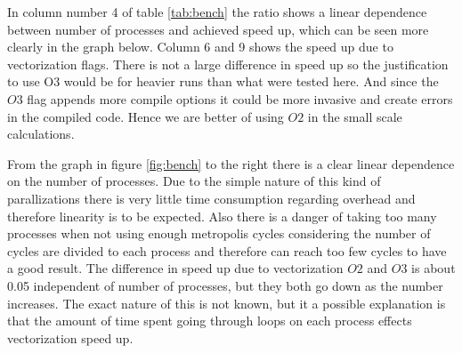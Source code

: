 %

In column number 4 of table \ref{tab:bench} the ratio shows a linear dependence between 
number of processes and achieved speed up, which can be seen more clearly 
in the graph below. Column 6 and 9 shows the speed up due to vectorization flags.
There is not a large difference in speed up so the justification to use O3 would 
be for heavier runs than what were tested here. And since the $O3$ flag appends
more compile options it could be more invasive and create errors in the compiled
code. Hence we are better of using $O2$ in the small scale calculations.

From the graph in figure \ref{fig:bench} to the right there is a clear linear 
dependence on the number of processes. Due to the simple nature of this kind of parallizations there is very
little time consumption regarding overhead and therefore linearity is to be expected.
Also there is a danger of taking too many processes when not using enough metropolis
cycles considering the number of cycles are divided to each process and therefore 
can reach too few cycles to have a good result.
The difference in speed up due to vectorization $O2$ and $O3$ is about 0.05 independent 
of number of processes, but they both go down as the number increases. The exact nature
of this is not known, but it a possible explanation is that the amount of
time spent going through loops on each process effects vectorization speed up.
%
